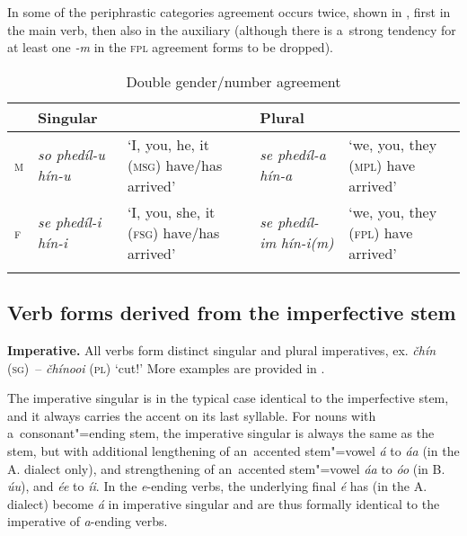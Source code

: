 In some of the periphrastic categories agreement occurs twice, shown in , first in the main verb, then also in the auxiliary (although there is a~strong tendency for at least one \textit{-m} in the \textsc{fpl} agreement forms to be dropped).


\begin{table}[ht]
\caption{Double gender/number agreement}

\begin{tabularx}{\textwidth}{ l P{20mm} Q P{20mm} Q }
\lsptoprule
&
Singular &
&
Plural &
\\\hline
\textsc{m} &
\textit{so phedíl-u hín-u} &
`I, you, he, it (\textsc{msg}) have/has arrived' &
\textit{se phedíl-a hín-a} &
`we, you, they (\textsc{mpl}) have arrived'\\
\textsc{f} &
\textit{se phedíl-i hín-i} &
`I, you, she, it (\textsc{fsg}) have/has arrived' &
\textit{se phedíl-im}
\textit{hín-i(m)} &
`we, you, they (\textsc{fpl}) have arrived'\\\lspbottomrule
\end{tabularx}
\label{tab:8-21}
\end{table}


\subsection{Verb forms derived from the imperfective stem}
\label{subsec:8-4-2}


\textbf{Imperative.} All verbs form distinct singular and plural imperatives, ex. \textit{čhín} \textsc{(sg)}~-- \textit{čhínooi} (\textsc{pl}) `cut!' More examples are provided in .



The imperative singular is in the typical case identical to the imperfective stem, and it always carries the accent on its last syllable. For nouns with a~consonant"=ending stem, the imperative singular is always the same as the stem, but with additional lengthening of an~accented stem"=vowel \textit{á} to \textit{áa} (in the A. dialect only), and strengthening of an~accented stem"=vowel \textit{áa} to \textit{óo} (in B. \textit{úu}), and \textit{ée} to \textit{íi}. In the \textit{e}-ending verbs, the underlying final \textit{é} has (in the A. dialect) become \textit{á} in imperative singular and are thus formally identical to the imperative of \textit{a}-ending verbs.


